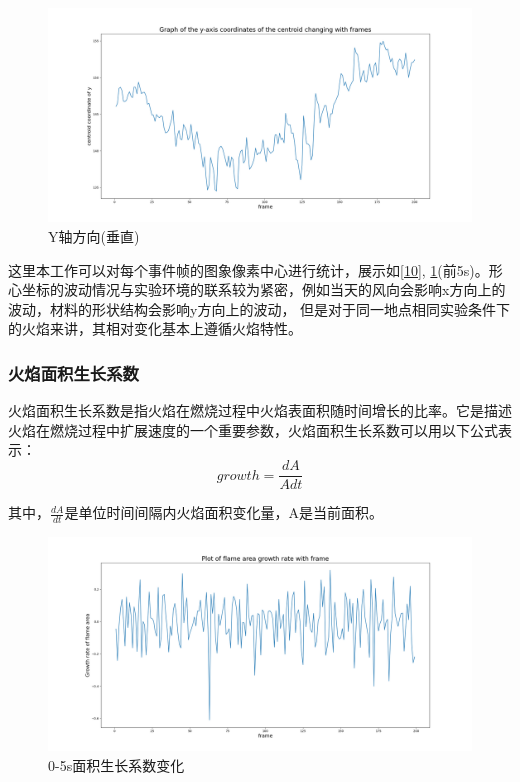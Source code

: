 \begin{figure}[ht]
    \centering
    \includegraphics[width=\textwidth]{figures/extract_centroid_y.png}
    \caption{Y轴方向(垂直)}
    \label{11}
\end{figure}

这里本工作可以对每个事件帧的图象像素中心进行统计，展示如\ref{10}, \ref{11}(前5s)。形心坐标的波动情况与实验环境的联系较为紧密，例如当天的风向会影响x方向上的波动，材料的形状结构会影响y方向上的波动，
但是对于同一地点相同实验条件下的火焰来讲，其相对变化基本上遵循火焰特性。

\subsubsection{火焰面积生长系数}
火焰面积生长系数是指火焰在燃烧过程中火焰表面积随时间增长的比率。它是描述火焰在燃烧过程中扩展速度的一个重要参数，火焰面积生长系数可以用以下公式表示：
\begin{equation} 
    growth=\frac{dA}{Adt}
\end{equation}

其中，$\frac{dA}{dt}$是单位时间间隔内火焰面积变化量，A是当前面积。

\begin{figure}[ht]
    \centering
    \includegraphics[width=\textwidth]{figures/extract_area_01.png}
    \caption{0-5s面积生长系数变化}
    \label{12}
\end{figure}

